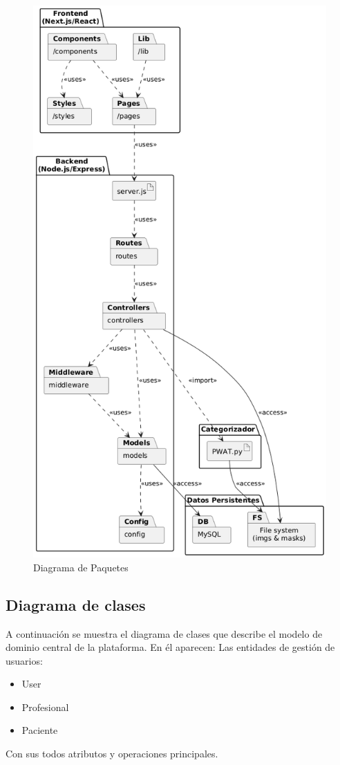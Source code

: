 \begin{figure}[H]
    \centering
    \includegraphics[width=0.7\linewidth]{imagenes/paquetes.png}
    \caption{Diagrama de Paquetes}
    \label{fig:packageDiagram}
\end{figure}
    
\subsection{Diagrama de clases}
\label{ssc:clases}
A continuación se muestra el diagrama de clases que describe el modelo de dominio central de la plataforma. En él aparecen:
Las entidades de gestión de usuarios:
\begin{itemize}
    \item  User
    \item Profesional
    \item Paciente
\end{itemize}
Con sus todos atributos y operaciones principales.


